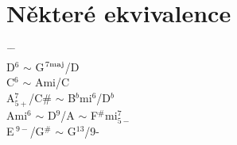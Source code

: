 \documentclass[12pt]{article}
\begin{document}












\newpage
\section{Některé ekvivalence}

\begin{tabbing}
\hspace{2cm} \= \ \hspace{0.8cm} \= \hspace{0.8cm} \= 
\\ D${}^6$          \> $\sim$ \> G${}^{7{\rm maj}}$/D
\\ C${}^6$          \> $\sim$ \> Ami/C
\\ A${}^7_{5+}$/C\# \> $\sim$ \> B${}^b$mi${}^{6}$/D${}^b$
\\ Ami${}^6$        \> $\sim$ \> D${}^{9}$/A $\sim$ F${}^\#$mi${}^{7}_{5-}$
\\ E${\,}^{9-}$/G${}^{\#}$ \> $\sim $ \> G${}^{13}$/9-

\end{tabbing}
\end{document}
